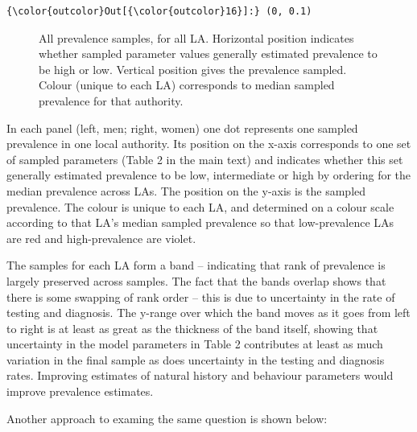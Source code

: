 \documentclass{article}
\begin{document}
    \begin{footnotesize}
            \begin{Verbatim}[commandchars=\\\{\}]
{\color{outcolor}Out[{\color{outcolor}16}]:} (0, 0.1)
\end{Verbatim}
    \end{footnotesize}
        
    \begin{figure}
        \begin{center}\end{center}
        \caption{All prevalence samples, for all LA. Horizontal position indicates whether sampled parameter values generally estimated prevalence to be high or low. Vertical position gives the prevalence sampled. Colour (unique to each LA) corresponds to median sampled prevalence for that authority.}
        \label{}
    \end{figure}
    
    In each panel (left, men; right, women) one dot represents one sampled
prevalence in one local authority. Its position on the x-axis
corresponds to one set of sampled parameters (Table 2 in the main text)
and indicates whether this set generally estimated prevalence to be low,
intermediate or high by ordering for the median prevalence across LAs.
The position on the y-axis is the sampled prevalence. The colour is
unique to each LA, and determined on a colour scale according to that
LA's median sampled prevalence so that low-prevalence LAs are red and
high-prevalence are violet.

The samples for each LA form a band -- indicating that rank of
prevalence is largely preserved across samples. The fact that the bands
overlap shows that there is some swapping of rank order -- this is due
to uncertainty in the rate of testing and diagnosis. The y-range over
which the band moves as it goes from left to right is at least as great
as the thickness of the band itself, showing that uncertainty in the
model parameters in Table 2 contributes at least as much variation in
the final sample as does uncertainty in the testing and diagnosis rates.
Improving estimates of natural history and behaviour parameters would
improve prevalence estimates.

Another approach to examing the same question is shown below:
\end{document}
